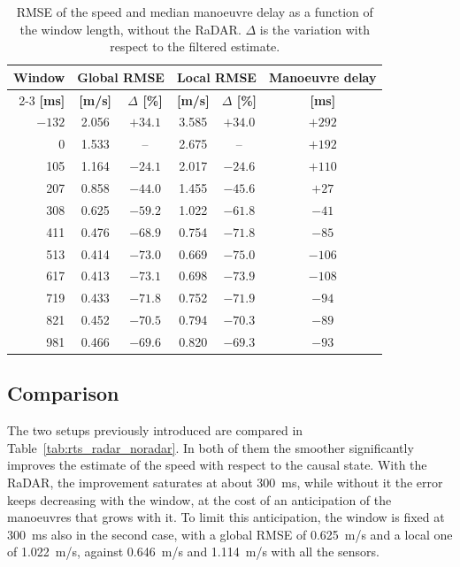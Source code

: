 \begin{table}[H]
\centering
\small
\begin{tabular}{|rccccc|}
\hline
\rowcolor{bluepoli!40} \textbf{Window} &\multicolumn{2}{c}{\textbf{Global RMSE}}&\multicolumn{2}{c}{\textbf{Local RMSE}}& \textbf{Manoeuvre delay} \\
\cline{2-3}\cline{4-5}
\rowcolor{bluepoli!40} \textbf{[ms]} & \textbf{[m/s]} & \textbf{$\Delta$ [\%]} & \textbf{[m/s]} & \textbf{$\Delta$ [\%]} & \textbf{[ms]} \\
\hline\hline
 $-132$ & 2.056 & $+34.1$ & 3.585 & $+34.0$ & $+292$ \\
      0 & 1.533 & -- & 2.675 & -- & $+192$ \\
    105 & 1.164 & $-24.1$ & 2.017 & $-24.6$ & $+110$ \\
    207 & 0.858 & $-44.0$ & 1.455 & $-45.6$ & $+27$ \\
    308 & 0.625 & $-59.2$ & 1.022 & $-61.8$ & $-41$ \\
    411 & 0.476 & $-68.9$ & 0.754 & $-71.8$ & $-85$ \\
    513 & 0.414 & $-73.0$ & 0.669 & $-75.0$ & $-106$ \\
    617 & 0.413 & $-73.1$ & 0.698 & $-73.9$ & $-108$ \\
    719 & 0.433 & $-71.8$ & 0.752 & $-71.9$ & $-94$ \\
    821 & 0.452 & $-70.5$ & 0.794 & $-70.3$ & $-89$ \\
    981 & 0.466 & $-69.6$ & 0.820 & $-69.3$ & $-93$ \\
\hline
\end{tabular}
\caption{RMSE of the speed and median manoeuvre delay as a function of the window length, without the RaDAR. $\Delta$ is the variation with respect to the filtered estimate.}
\label{tab:rts_noradar}
\end{table}

\FloatBarrier
\subsection*{Comparison}
\label{subsec:rts_comparison}

The two setups previously introduced are compared in Table~\ref{tab:rts_radar_noradar}. In both of them the smoother
significantly improves the estimate of the speed with respect to the causal state. With the
RaDAR, the improvement saturates at about \SI{300}{ms}, while without it the error keeps
decreasing with the window, at the cost of an anticipation of the manoeuvres that grows with
it. To limit this anticipation, the window is fixed at \SI{300}{ms} also in the second case, with a global RMSE of \SI{0.625}{m/s} and a local one of
\SI{1.022}{m/s}, against \SI{0.646}{m/s} and \SI{1.114}{m/s} with all the sensors.

